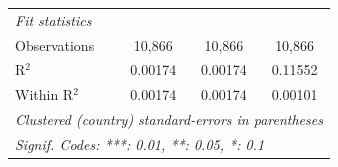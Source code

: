 \begin{table}[htbp]
\begin{tabular}{lccc}
      \midrule
      \emph{Fit statistics}\\
      Observations                                    & 10,866        & 10,866        & 10,866\\  
      R$^2$                                           & 0.00174       & 0.00174       & 0.11552\\  
      Within R$^2$                                    & 0.00174       & 0.00174       & 0.00101\\  
      \midrule \midrule
      \multicolumn{4}{l}{\emph{Clustered (country) standard-errors in parentheses}}\\
      \multicolumn{4}{l}{\emph{Signif. Codes: ***: 0.01, **: 0.05, *: 0.1}}\\
   \end{tabular}
\end{table}


